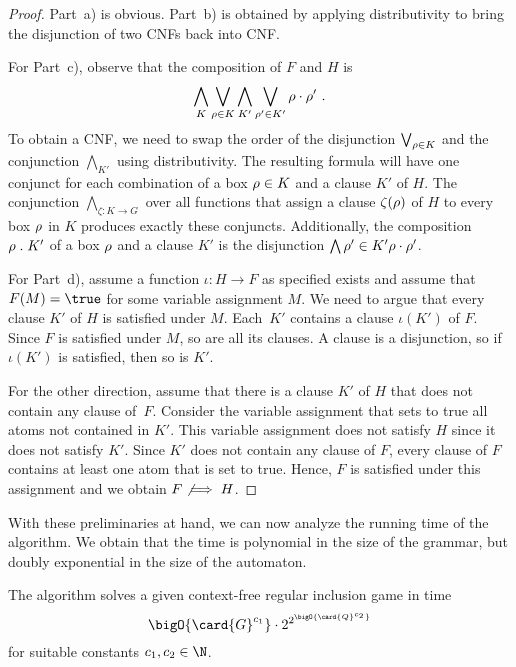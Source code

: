 \documentclass[../../diss.tex]{subfiles}
\begin{document}
\begin{proof}
    Part~a) is obvious.
    Part~b) is obtained by applying distributivity to bring the disjunction of two CNFs back into CNF.\@

    For Part~c), observe that the composition of $F$ and $H$ is
    \[
        \bigwedge_{K} \bigvee_{\tbox \in K}
        \bigwedge_{K'} \bigvee_{\tbox' \in K'}
            \tbox \cdot \tbox'
        \ .
    \]
    To obtain a CNF, we need to swap the order of the disjunction $\bigvee_{\tbox \in K}$ and the conjunction $\bigwedge_{K'}$ using distributivity.
    The resulting formula will have one conjunct for each combination of a box $\tbox \in K$ and a clause $K'$ of $H$.
    The conjunction $\bigwedge_{\zeta \colon K \to G}$ over all functions that assign a clause $\zeta(\tbox)$ of $H$ to every box $\tbox$ in $K$ produces exactly these conjuncts.
    Additionally, the composition $\tbox \comp K'$ of a box $\tbox$ and a clause $K'$ is the disjunction $\bigwedge{\tbox' \in K'} \tbox \cdot \tbox'$.

    For Part~d), assume a function $\iota \colon H \to F$ as specified exists and assume that $F(M) = \true$ for some variable assignment $M$.
    We need to argue that every clause $K'$ of $H$ is satisfied under $M$.
    Each~$K'$ contains a clause $\iota(K')$ of $F$.
    Since $F$ is satisfied under $M$, so are all its clauses.
    A clause is a disjunction, so if $\iota(K')$ is satisfied, then so is $K'$.

    For the other direction, assume that there is a clause $K'$ of $H$ that does not contain any clause of~$F$.
    Consider the variable assignment that sets to true all atoms not contained in $K'$.
    This variable assignment does not satisfy $H$ since it does not satisfy $K'$.
    Since $K'$ does not contain any clause of $F$, every clause of $F$ contains at least one atom that is set to true.
    Hence, $F$ is satisfied under this assignment and we obtain $F \not\implies H$.
\end{proof}

With these preliminaries at hand, we can now analyze the running time of the algorithm.
We obtain that the time is polynomial in the size of the grammar, but doubly exponential in the size of the automaton.

\begin{proposition}%
\label{Proposition:CFGamesComplexityMembership}%
    The algorithm solves a given context-free regular inclusion game in time
    \[
        \bigO{\card{G}^{c_1}} \cdot 2^{2^{\bigO{\card{Q}^{c_2}}}}
    \]
    for suitable constants $c_1, c_2 \in \N$.
\end{proposition}
\end{document}
